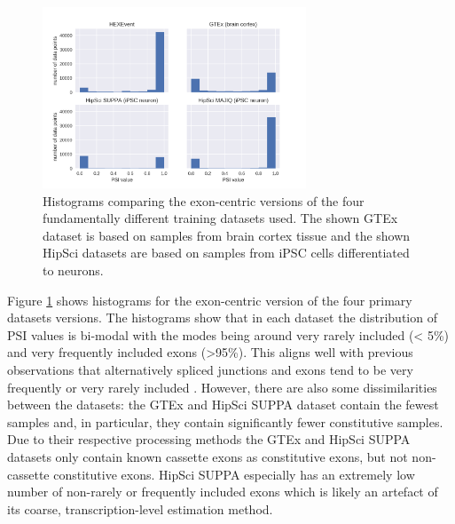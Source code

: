 
\begin{figure}
	\centering\includegraphics[width=0.7\textwidth]{../visualizations/ch4-methods/dataset_histograms_seaborn.png} 
	\caption[test.]{
		Histograms comparing the exon-centric versions of the four fundamentally different training datasets used. The shown GTEx dataset is based on samples from brain cortex tissue and  the shown HipSci datasets are based on samples from iPSC cells differentiated to neurons. 
	}
	\label{fig:datahistograms}
\end{figure}

Figure \ref{fig:datahistograms} shows histograms for the exon-centric version of the four primary datasets versions. The histograms show that in each dataset the distribution of PSI values is bi-modal with the modes being around very rarely included (< 5\%) and very frequently included exons (>95\%). This aligns well with previous observations that alternatively spliced junctions and exons tend to be very frequently or very rarely included \cite{buschhertel} \cite{bimodalpsivalues1} \cite{bimodalpsivalues2}. However, there are also some dissimilarities between the datasets: the GTEx and HipSci SUPPA dataset contain the fewest samples and, in particular, they contain significantly fewer constitutive samples.\\
Due to their respective processing methods the GTEx and HipSci SUPPA datasets only contain known cassette exons as constitutive exons, but not non-cassette constitutive exons. 
HipSci SUPPA especially has an extremely low number of non-rarely or frequently included exons which is likely an artefact of its coarse, transcription-level estimation method.\\

